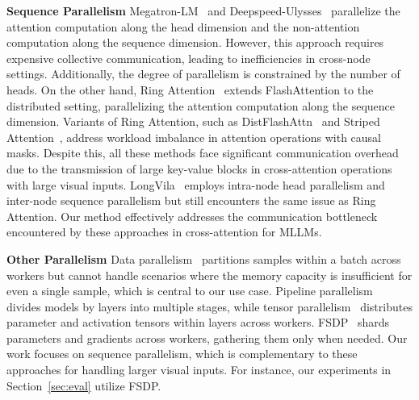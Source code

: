 \textbf{Sequence Parallelism} Megatron-LM~\cite{korthikanti2023megatron-lm} and Deepspeed-Ulysses~\cite{jacobs2024ds} parallelize the attention computation along the head dimension and the non-attention computation along the sequence dimension. However, this approach requires expensive collective communication, leading to inefficiencies in cross-node settings. Additionally, the degree of parallelism is constrained by the number of heads. On the other hand, Ring Attention~\cite{liu2024ring} extends FlashAttention to the distributed setting, parallelizing the attention computation along the sequence dimension. Variants of Ring Attention, such as DistFlashAttn~\cite{li2024distflashattn} and Striped Attention~\cite{brandon2023striped}, address workload imbalance in attention operations with causal masks. Despite this, all these methods face significant communication overhead due to the transmission of large key-value blocks in cross-attention operations with large visual inputs. LongVila~\cite{chen2024longvila} employs intra-node head parallelism and inter-node sequence parallelism but still encounters the same issue as Ring Attention. Our method effectively addresses the communication bottleneck encountered by these approaches in cross-attention for MLLMs.

\textbf{Other Parallelism} Data parallelism~\cite{dean2012data-parallel} partitions samples within a batch across workers but cannot handle scenarios where the memory capacity is insufficient for even a single sample, which is central to our use case. Pipeline parallelism~\cite{narayanan2019pipedream} divides models by layers into multiple stages, while tensor parallelism~\cite{shoeybi2019megatron} distributes parameter and activation tensors within layers across workers. FSDP~\cite{rajbhandari2020zero} shards parameters and gradients across workers, gathering them only when needed. Our work focuses on sequence parallelism, which is complementary to these approaches for handling larger visual inputs. For instance, our experiments in Section~\ref{sec:eval} utilize FSDP.